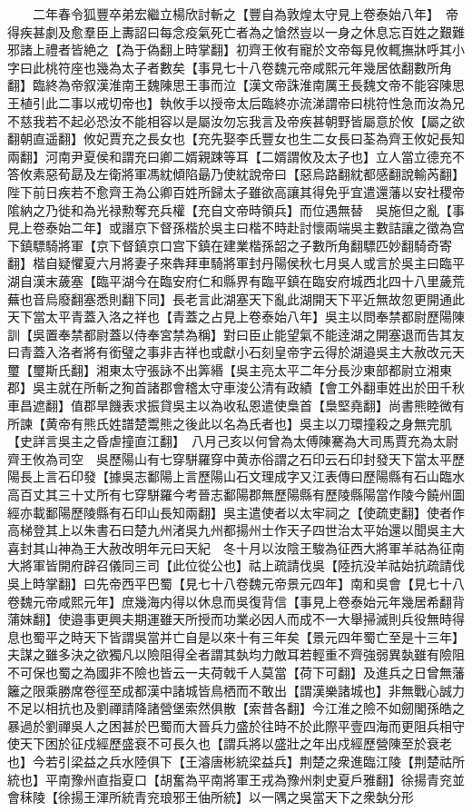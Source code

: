 　　二年春令狐豐卒弟宏繼立楊欣討斬之【豐自為敦煌太守見上卷泰始八年】　帝得疾甚劇及愈羣臣上夀詔曰每念疫氣死亡者為之愴然豈以一身之休息忘百姓之艱難邪諸上禮者皆絶之【為于偽翻上時掌翻】初齊王攸有寵於文帝每見攸輒撫牀呼其小字曰此桃符座也幾為太子者數矣【事見七十八卷魏元帝咸熙元年幾居依翻數所角翻】臨終為帝叙漢淮南王魏陳思王事而泣【漢文帝誅淮南厲王長魏文帝不能容陳思王植引此二事以戒切帝也】執攸手以授帝太后臨終亦流涕謂帝曰桃符性急而汝為兄不慈我若不起必恐汝不能相容以是屬汝勿忘我言及帝疾甚朝野皆屬意於攸【屬之欲翻朝直遥翻】攸妃賈充之長女也【充先娶李氏豐女也生二女長曰荃為齊王攸妃長知兩翻】河南尹夏侯和謂充曰卿二婿親踈等耳【二婿謂攸及太子也】立人當立德充不答攸素惡荀勗及左衛將軍馮紞傾陷朂乃使紞說帝曰【惡烏路翻紞都感翻說輸芮翻】陛下前日疾若不愈齊王為公卿百姓所歸太子雖欲高讓其得免乎宜遣還藩以安社稷帝隂納之乃徙和為光禄勲奪充兵權【充自文帝時領兵】而位遇無替　吳施但之亂【事見上卷泰始二年】或譖京下督孫楷於吳主曰楷不時赴討懷兩端吳主數詰讓之徵為宫下鎮驃騎將軍【京下督鎮京口宫下鎮在建業楷孫韶之子數所角翻驃匹妙翻騎奇寄翻】楷自疑懼夏六月將妻子來犇拜車騎將軍封丹陽侯秋七月吳人或言於吳主曰臨平湖自漢末薉塞【臨平湖今在臨安府仁和縣界有臨平鎮在臨安府城西北四十八里薉荒蕪也音烏廢翻塞悉則翻下同】長老言此湖塞天下亂此湖開天下平近無故忽更開通此天下當太平青蓋入洛之祥也【青蓋之占見上卷泰始八年】吳主以問奉禁都尉歷陽陳訓【吳置奉禁都尉蓋以侍奉宮禁為稱】對曰臣止能望氣不能逹湖之開塞退而告其友曰青蓋入洛者將有銜璧之事非吉祥也或獻小石刻皇帝字云得於湖邉吳主大赦改元天璽【璽斯氏翻】湘東太守張詠不出筭緡【吳主亮太平二年分長沙東部都尉立湘東郡】吳主就在所斬之狥首諸郡會稽太守車浚公清有政績【會工外翻車姓出於田千秋車昌遮翻】值郡旱饑表求振貸吳主以為收私恩遣使梟首【梟堅堯翻】尚書熊睦微有所諫【黄帝有熊氏姓譜楚鬻熊之後此以名為氏者也】吳主以刀環撞殺之身無完肌【史詳言吳主之昏虐撞直江翻】　八月己亥以何曾為太傅陳騫為大司馬賈充為太尉齊王攸為司空　吳歷陽山有七穿駢羅穿中黄赤俗謂之石印云石印封發天下當太平歷陽長上言石印發【據吳志鄱陽上言歷陽山石文理成字又江表傳曰歷陽縣有石山臨水高百丈其三十丈所有七穿駢羅今考晉志鄱陽郡無歷陽縣有歷陵縣陽當作陵今饒州圖經亦載鄱陽歷陵縣有石印山長知兩翻】吳主遣使者以太牢祠之【使疏吏翻】使者作高梯登其上以朱書石曰楚九州渚吳九州都揚州士作天子四世治太平始還以聞吳主大喜封其山神為王大赦改明年元曰天紀　冬十月以汝陰王駿為征西大將軍羊祜為征南大將軍皆開府辟召儀同三司【此位從公也】祜上疏請伐吳【陸抗没羊祜始抗疏請伐吳上時掌翻】曰先帝西平巴蜀【見七十八卷魏元帝景元四年】南和吳會【見七十八卷魏元帝咸熙元年】庶幾海内得以休息而吳復背信【事見上卷泰始元年幾居希翻背蒲妹翻】使邉事更興夫期運雖天所授而功業必因人而成不一大舉掃滅則兵役無時得息也蜀平之時天下皆謂吳當并亡自是以來十有三年矣【景元四年蜀亡至是十三年】夫謀之雖多決之欲獨凡以險阻得全者謂其埶均力敵耳若輕重不齊強弱異埶雖有險阻不可保也蜀之為國非不險也皆云一夫荷戟千人莫當【荷下可翻】及進兵之日曾無藩籬之限乘勝席卷徑至成都漢中諸城皆鳥栖而不敢出【謂漢樂諸城也】非無戰心誠力不足以相抗也及劉禪請降諸營堡索然俱散【索昔各翻】今江淮之險不如劒閣孫皓之暴過於劉禪吳人之困甚於巴蜀而大晉兵力盛於往時不於此際平壹四海而更阻兵相守使天下困於征戍經歷盛衰不可長久也【謂兵將以盛壯之年出戍經歷營陳至於衰老也】今若引梁益之兵水陸俱下【王濬唐彬統梁益兵】荆楚之衆進臨江陵【荆楚祜所統也】平南豫州直指夏口【胡奮為平南將軍王戎為豫州刺史夏戶雅翻】徐揚青兖並會秣陵【徐揚王渾所統青兖琅邪王伷所統】以一隅之吳當天下之衆埶分形